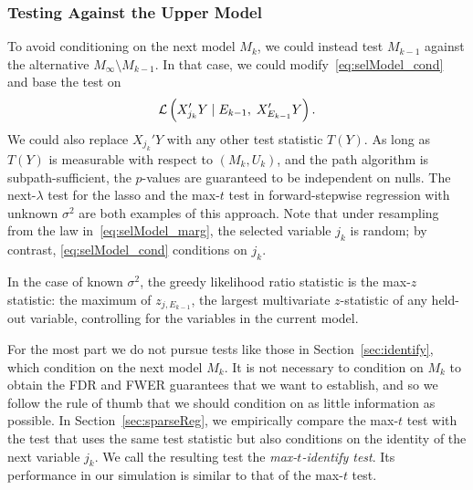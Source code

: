 \documentclass{article}
\begin{document}
\subsubsection{Testing Against the Upper Model}


To avoid conditioning on the next model $M_k$, we could instead test $M_{k-1}$ against the alternative $M_{\infty}\setminus M_{k-1}$. In that case, we could modify~\eqref{eq:selModel_cond} and base the test on
\begin{equation}\label{eq:selModel_marg}
\mathcal{L}\left(X_{j_k}'Y \mid E_{k-1}, \; X_{E_{k-1}}'Y\right).
\end{equation}
We could also replace $X_{j_k}'Y$ with any other test statistic $T(Y)$. As long as $T(Y)$ is measurable with respect to $(M_k, U_k)$, and the path algorithm is subpath-sufficient, the $p$-values are guaranteed to be independent on nulls. The next-$\lambda$ test for the lasso and the max-$t$ test in forward-stepwise regression with unknown $\sigma^2$ are both examples of this approach. Note that under resampling from the law in~\eqref{eq:selModel_marg}, the selected variable $j_k$ is random; by contrast, \eqref{eq:selModel_cond} conditions on $j_k$.

In the case of known $\sigma^2$, the greedy likelihood ratio statistic is the max-$z$ statistic: the maximum of $z_{j,E_{k-1}}$, the largest multivariate $z$-statistic of any held-out variable, controlling for the variables in the current model.

For the most part we do not pursue tests like those in Section~\ref{sec:identify}, which condition on the next model $M_k$. It is not necessary to condition on $M_k$ to obtain the FDR and FWER guarantees that we want to establish, and so we follow the rule of thumb that we should condition on as little information as possible. In Section~\ref{sec:sparseReg}, we empirically compare the max-$t$ test with the test that uses the same test statistic but also conditions on the identity of the next variable $j_k$. We call the resulting test the {\em max-$t$-identify test}. Its performance in our simulation is similar to that of the max-$t$ test.
\end{document}
